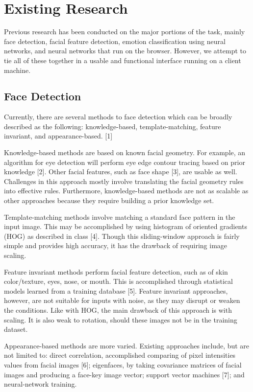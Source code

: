 \documentclass[10pt,twocolumn,letterpaper]{article}
\begin{document}
\section{Existing Research}

Previous research has been conducted on the major portions of the task, mainly face detection, facial feature detection, emotion classification using neural networks, and neural networks that run on the browser. However, we attempt to tie all of these together in a usable and functional interface running on a client machine. 


\subsection{Face Detection}
Currently, there are several methods to face detection which can be broadly described as the following: knowledge-based, template-matching, feature invariant, and appearance-based. [1]

Knowledge-based methods are based on known facial geometry. For example, an algorithm for eye detection will perform eye edge contour tracing based on prior knowledge [2]. Other facial features, such as face shape [3], are usable as well. Challenges in this approach mostly involve translating the facial geometry rules into effective rules. Furthermore, knowledge-based methods are not as scalable as other approaches because they require building a prior knowledge set.

Template-matching methods involve matching a standard face pattern in the input image. This may be accomplished by using histogram of oriented gradients (HOG) as described in class [4]. Though this sliding-window approach is fairly simple and provides high accuracy, it has the drawback of requiring image scaling.

Feature invariant methods perform facial feature detection, such as of skin color/texture, eyes, nose, or mouth. This is accomplished through statistical models learned from a training database [5]. Feature invariant approaches, however, are not suitable for inputs with noise, as they may disrupt or weaken the conditions. Like with HOG, the main drawback of this approach is with scaling. It is also weak to rotation, should these images not be in the training dataset.

Appearance-based methods are more varied. Existing approaches include, but are not limited to: direct correlation, accomplished comparing of pixel intensities values from facial images [6]; eigenfaces, by taking covariance matrices of facial images and producing a face-key image vector; support vector machines [7]; and neural-network training.
\end{document}
